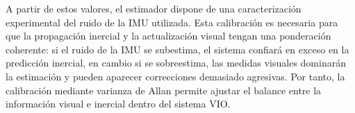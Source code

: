 A partir de estos valores, el estimador dispone de una caracterización experimental del
ruido de la IMU utilizada. Esta calibración es necesaria para que la propagación inercial
y la actualización visual tengan una ponderación coherente: si el ruido de la IMU se
subestima, el sistema confiará en exceso en la predicción inercial, en cambio si se sobreestima, las
medidas visuales dominarán la estimación y pueden aparecer correcciones demasiado
agresivas. Por tanto, la calibración mediante varianza de Allan permite ajustar el balance
entre la información visual e inercial dentro del sistema VIO.
